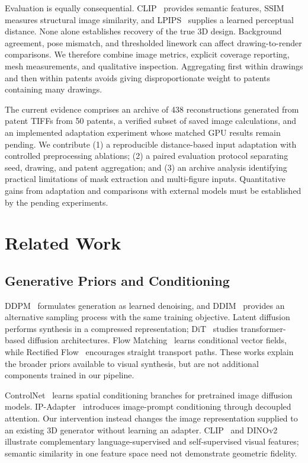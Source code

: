 Evaluation is equally consequential. CLIP~\cite{radford2021clip} provides semantic
features, SSIM~\cite{wang2004ssim} measures structural image similarity, and
LPIPS~\cite{zhang2018lpips} supplies a learned perceptual distance. None alone
establishes recovery of the true 3D design. Background agreement, pose mismatch,
and thresholded linework can affect drawing-to-render comparisons. We therefore
combine image metrics, explicit coverage reporting, mesh measurements, and
qualitative inspection. Aggregating first within drawings and then within patents
avoids giving disproportionate weight to patents containing many drawings.

The current evidence comprises an archive of 438 reconstructions generated from patent TIFFs from
50 patents, a verified subset of saved image calculations, and an implemented
adaptation experiment whose matched GPU results remain pending. We contribute
(1) a reproducible distance-based input adaptation with controlled preprocessing
ablations; (2) a paired evaluation protocol separating seed, drawing, and patent
aggregation; and (3) an archive analysis identifying practical limitations of
mask extraction and multi-figure inputs. Quantitative gains from adaptation and
comparisons with external models must be established by the pending experiments.

\section{Related Work}
\label{sec:related_work}

\subsection{Generative Priors and Conditioning}
DDPM~\cite{ho2020ddpm} formulates generation as learned denoising, and
DDIM~\cite{song2020ddim} provides an alternative sampling process with the same
training objective. Latent diffusion~\cite{rombach2022ldm} performs synthesis in
a compressed representation; DiT~\cite{peebles2023dit} studies transformer-based
diffusion architectures. Flow Matching~\cite{lipman2023flow} learns conditional
vector fields, while Rectified Flow~\cite{liu2023rectified} encourages straight
transport paths. These works explain the broader priors available to visual
synthesis, but are not additional components trained in our pipeline.

ControlNet~\cite{zhang2023controlnet} learns spatial conditioning branches for
pretrained image diffusion models. IP-Adapter~\cite{ye2023ipadapter} introduces
image-prompt conditioning through decoupled attention. Our intervention instead
changes the image representation supplied to an existing 3D generator without
learning an adapter. CLIP~\cite{radford2021clip} and DINOv2~\cite{oquab2023dinov2}
illustrate complementary language-supervised and self-supervised visual features;
semantic similarity in one feature space need not demonstrate geometric fidelity.

